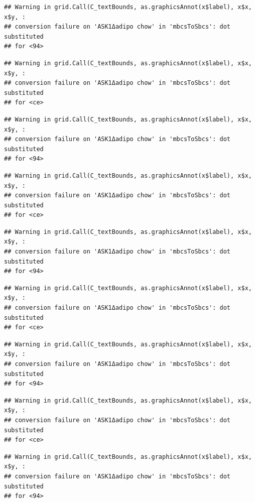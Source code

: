 \documentclass[]{book}
\begin{document}
\begin{verbatim}
## Warning in grid.Call(C_textBounds, as.graphicsAnnot(x$label), x$x, x$y, :
## conversion failure on 'ASK1Δadipo chow' in 'mbcsToSbcs': dot substituted
## for <94>
\end{verbatim}

\begin{verbatim}
## Warning in grid.Call(C_textBounds, as.graphicsAnnot(x$label), x$x, x$y, :
## conversion failure on 'ASK1Δadipo chow' in 'mbcsToSbcs': dot substituted
## for <ce>
\end{verbatim}

\begin{verbatim}
## Warning in grid.Call(C_textBounds, as.graphicsAnnot(x$label), x$x, x$y, :
## conversion failure on 'ASK1Δadipo chow' in 'mbcsToSbcs': dot substituted
## for <94>
\end{verbatim}

\begin{verbatim}
## Warning in grid.Call(C_textBounds, as.graphicsAnnot(x$label), x$x, x$y, :
## conversion failure on 'ASK1Δadipo chow' in 'mbcsToSbcs': dot substituted
## for <ce>
\end{verbatim}

\begin{verbatim}
## Warning in grid.Call(C_textBounds, as.graphicsAnnot(x$label), x$x, x$y, :
## conversion failure on 'ASK1Δadipo chow' in 'mbcsToSbcs': dot substituted
## for <94>
\end{verbatim}

\begin{verbatim}
## Warning in grid.Call(C_textBounds, as.graphicsAnnot(x$label), x$x, x$y, :
## conversion failure on 'ASK1Δadipo chow' in 'mbcsToSbcs': dot substituted
## for <ce>
\end{verbatim}

\begin{verbatim}
## Warning in grid.Call(C_textBounds, as.graphicsAnnot(x$label), x$x, x$y, :
## conversion failure on 'ASK1Δadipo chow' in 'mbcsToSbcs': dot substituted
## for <94>
\end{verbatim}

\begin{verbatim}
## Warning in grid.Call(C_textBounds, as.graphicsAnnot(x$label), x$x, x$y, :
## conversion failure on 'ASK1Δadipo chow' in 'mbcsToSbcs': dot substituted
## for <ce>
\end{verbatim}

\begin{verbatim}
## Warning in grid.Call(C_textBounds, as.graphicsAnnot(x$label), x$x, x$y, :
## conversion failure on 'ASK1Δadipo chow' in 'mbcsToSbcs': dot substituted
## for <94>
\end{verbatim}
\end{document}
